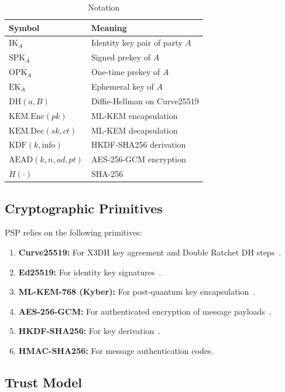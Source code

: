 \documentclass[11pt,a4paper]{article}
\begin{document}
\begin{table}[h]
\centering
\caption{Notation}
\label{tab:notation}
\begin{tabular}{@{}ll@{}}
\toprule
\textbf{Symbol} & \textbf{Meaning} \\
\midrule
$\mathrm{IK}_A$ & Identity key pair of party $A$ \\
$\mathrm{SPK}_A$ & Signed prekey of $A$ \\
$\mathrm{OPK}_A$ & One-time prekey of $A$ \\
$\mathrm{EK}_A$ & Ephemeral key of $A$ \\
$\mathrm{DH}(a,B)$ & Diffie-Hellman on Curve25519 \\
$\mathrm{KEM.Enc}(pk)$ & ML-KEM encapsulation \\
$\mathrm{KEM.Dec}(sk, ct)$ & ML-KEM decapsulation \\
$\mathrm{KDF}(k, \text{info})$ & HKDF-SHA256 derivation \\
$\mathrm{AEAD}(k, n, ad, pt)$ & AES-256-GCM encryption \\
$H(\cdot)$ & SHA-256 \\
\bottomrule
\end{tabular}
\end{table}

\subsection{Cryptographic Primitives}

PSP relies on the following primitives:

\begin{enumerate}
    \item \textbf{Curve25519:} For X3DH key agreement and Double Ratchet
    DH steps~\cite{bernstein2006curve25519}.
    \item \textbf{Ed25519:} For identity key signatures~\cite{bernstein2012eddsa}.
    \item \textbf{ML-KEM-768 (Kyber):} For post-quantum key
    encapsulation~\cite{bos2018crystals}.
    \item \textbf{AES-256-GCM:} For authenticated encryption of message
    payloads~\cite{mcgrew2004aes}.
    \item \textbf{HKDF-SHA256:} For key derivation~\cite{krawczyk2010hkdf}.
    \item \textbf{HMAC-SHA256:} For message authentication codes.
\end{enumerate}

\subsection{Trust Model}
\end{document}
